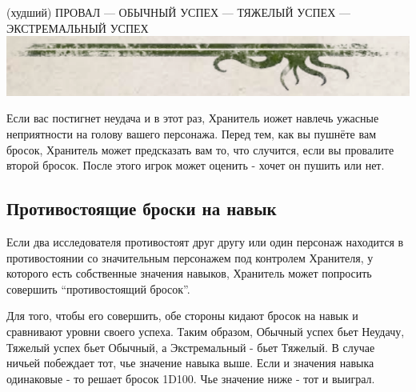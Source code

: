 \documentclass[letterpaper,twocolumn,openany, twoside, 11pt, usenames]{cocbook}
\begin{document}
\begin{fullcocpaperbox}{}{}
  (худший) ПРОВАЛ --- ОБЫЧНЫЙ УСПЕХ --- ТЯЖЕЛЫЙ УСПЕХ --- ЭКСТРЕМАЛЬНЫЙ УСПЕХ
  \includegraphics[width=\linewidth]{img/bottom.png}
\end{fullcocpaperbox}

Если вас постигнет неудача и в этот раз, Хранитель иожет навлечь ужасные неприятности на голову вашего персонажа. Перед тем, как вы пушнёте вам бросок, Хранитель может предсказать вам то, что случится, если вы провалите второй бросок. После этого игрок может оценить - хочет он пушить или нет.
\smallbreak
\noindent {}

\subsection*{Противостоящие броски на навык}

Если два исследователя противостоят друг другу или один персонаж находится в противостоянии со значительным персонажем под контролем Хранителя, у которого есть собственные значения навыков, Хранитель может попросить совершить ``противостоящий бросок''.

Для того, чтобы его совершить, обе стороны кидают бросок на навык и сравнивают уровни своего успеха. Таким образом, Обычный успех бьет Неудачу, Тяжелый успех бьет Обычный, а Экстремальный - бьет Тяжелый. В случае ничьей побеждает тот, чье значение навыка выше. Если и значения навыка одинаковые - то решает бросок 1D100. Чье значение ниже - тот и выиграл.
\end{document}
